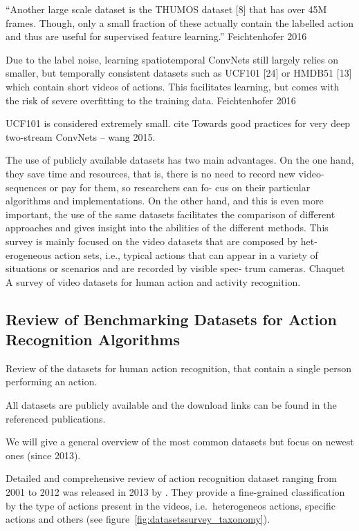``Another large scale dataset is the THUMOS dataset [8] that has over 45M frames. Though, only a small fraction of these actually contain the labelled action and thus are useful for supervised feature learning.'' Feichtenhofer 2016

Due to the label noise, learning spatiotemporal ConvNets still largely relies on smaller, but temporally consistent datasets such as UCF101 [24] or HMDB51 [13] which contain short videos of actions.
This facilitates learning, but comes with the risk of severe overfitting to the training data. Feichtenhofer 2016

UCF101 is considered extremely small. cite Towards good practices for very deep two-stream ConvNets -- wang 2015.


The use of
publicly available datasets has two main advantages. On the one
hand, they save time and resources, that is, there is no need to
record new video-sequences or pay for them, so researchers can fo-
cus on their particular algorithms and implementations. On the
other hand, and this is even more important, the use of the same
datasets facilitates the comparison of different approaches and
gives insight into the abilities of the different methods. This survey
is mainly focused on the video datasets that are composed by het-
erogeneous action sets, i.e., typical actions that can appear in a
variety of situations or scenarios and are recorded by visible spec-
trum cameras.
Chaquet A survey of video datasets for human action and activity recognition.

\subsection{Review of Benchmarking Datasets for Action Recognition Algorithms}
Review of the datasets for human action recognition, that contain a single person performing an action.

All datasets are publicly available and the download links can be found in the referenced publications.

We will give a general overview of the most common datasets but focus on newest ones (since 2013). 

Detailed and comprehensive review of action recognition dataset ranging from 2001 to 2012 was released in 2013 by \textcite{chaquet_survey_2013}.
They provide a fine-grained classification by the type of actions present in the videos, i.e.\ heterogeneos actions, specific actions and others (see figure~\ref{fig:datasetssurvey_taxonomy}).

